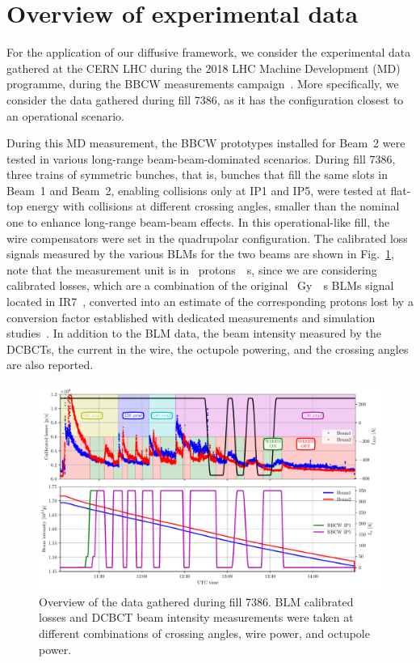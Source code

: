 \section{Overview of experimental data}\label{sec:5:wire-data}

For the application of our diffusive framework, we consider the experimental data gathered at the CERN LHC during the 2018 LHC Machine Development (MD) programme, during the BBCW measurements campaign~\cite{Poyet:2703503}. More specifically, we consider the data gathered during fill 7386, as it has the configuration closest to an operational scenario.

During this MD measurement, the BBCW prototypes installed for Beam~2 were tested in various long-range beam-beam-dominated scenarios. During fill 7386, three trains of symmetric bunches, that is, bunches that fill the same slots in Beam~1 and Beam~2, enabling collisions only at IP1 and IP5, were tested at flat-top energy with collisions at different crossing angles, smaller than the nominal one to enhance long-range beam-beam effects. In this operational-like fill, the wire compensators were set in the quadrupolar configuration. The calibrated loss signals measured by the various BLMs for the two beams are shown in Fig.~\ref{fig:wire-data}, note that the measurement unit is in \SI{}{protons \per s}, since we are considering calibrated losses, which are a combination of the original \SI{}{Gy \per s} BLMs signal located in IR7~\cite{blmcalibratedlosses}, converted into an estimate of the corresponding protons lost by a conversion factor established with dedicated measurements and simulation studies~\cite{4439981}. In addition to the BLM data, the beam intensity measured by the DCBCTs, the current in the wire, the octupole powering, and the crossing angles are also reported. 

\begin{figure}[th]
    \centering
    \includegraphics[width=1.0\textwidth]{5_wire_compensators_LHC/figs/wire_summary.pdf}
    \caption{Overview of the data gathered during fill 7386. BLM calibrated losses and DCBCT beam intensity measurements were taken at different combinations of crossing angles, wire power, and octupole power.}
    \label{fig:wire-data}
\end{figure}

